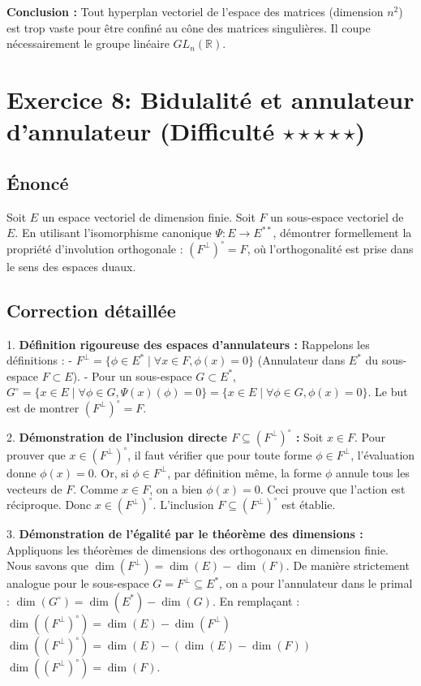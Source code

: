\documentclass[11pt,a4paper]{report}
\begin{document}
\textbf{Conclusion :}
Tout hyperplan vectoriel de l'espace des matrices (dimension $n^2$) est trop vaste pour être confiné au cône des matrices singulières. Il coupe nécessairement le groupe linéaire $GL_n(\mathbb{R})$.

\section{Exercice 8: Bidulalité et annulateur d'annulateur (Difficulté $\star \star \star \star \star$)}

\subsection{Énoncé}
Soit $E$ un espace vectoriel de dimension finie. Soit $F$ un sous-espace vectoriel de $E$. En utilisant l'isomorphisme canonique $\Psi : E \to E^{**}$, démontrer formellement la propriété d'involution orthogonale : $(F^\perp)^\circ = F$, où l'orthogonalité est prise dans le sens des espaces duaux.

\subsection{Correction détaillée}

1. \textbf{Définition rigoureuse des espaces d'annulateurs :}
   Rappelons les définitions :
   - $F^\perp = \{ \phi \in E^* \mid \forall x \in F, \phi(x) = 0 \}$ (Annulateur dans $E^*$ du sous-espace $F \subset E$).
   - Pour un sous-espace $G \subset E^*$, $G^\circ = \{ x \in E \mid \forall \phi \in G, \Psi(x)(\phi) = 0 \} = \{ x \in E \mid \forall \phi \in G, \phi(x) = 0 \}$.
   Le but est de montrer $(F^\perp)^\circ = F$.

2. \textbf{Démonstration de l'inclusion directe $F \subseteq (F^\perp)^\circ$ :}
   Soit $x \in F$.
   Pour prouver que $x \in (F^\perp)^\circ$, il faut vérifier que pour toute forme $\phi \in F^\perp$, l'évaluation donne $\phi(x) = 0$.
   Or, si $\phi \in F^\perp$, par définition même, la forme $\phi$ annule tous les vecteurs de $F$. Comme $x \in F$, on a bien $\phi(x) = 0$.
   Ceci prouve que l'action est réciproque. Donc $x \in (F^\perp)^\circ$.
   L'inclusion $F \subseteq (F^\perp)^\circ$ est établie.

3. \textbf{Démonstration de l'égalité par le théorème des dimensions :}
   Appliquons les théorèmes de dimensions des orthogonaux en dimension finie.
   Nous savons que $\dim(F^\perp) = \dim(E) - \dim(F)$.
   De manière strictement analogue pour le sous-espace $G = F^\perp \subseteq E^*$, on a pour l'annulateur dans le primal :
   $\dim(G^\circ) = \dim(E^*) - \dim(G)$.
   En remplaçant :
   $\dim((F^\perp)^\circ) = \dim(E) - \dim(F^\perp)$
   $\dim((F^\perp)^\circ) = \dim(E) - (\dim(E) - \dim(F))$
   $\dim((F^\perp)^\circ) = \dim(F)$.
\end{document}
